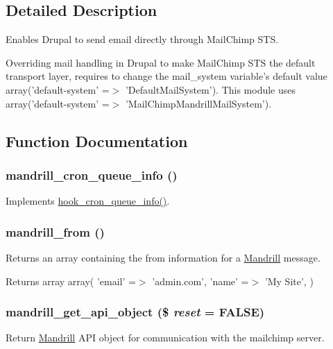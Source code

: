 \subsection{Detailed Description}
Enables Drupal to send email directly through MailChimp STS.

Overriding mail handling in Drupal to make MailChimp STS the default transport layer, requires to change the mail\_\-system variable's default value array('default-\/system' =$>$ 'DefaultMailSystem'). This module uses array('default-\/system' =$>$ 'MailChimpMandrillMailSystem'). 

\subsection{Function Documentation}
\hypertarget{mandrill_8module_aef3727ae488149f312f6951a77bbf7a9}{
\subsubsection[{mandrill\_\-cron\_\-queue\_\-info}]{\setlength{\rightskip}{0pt plus 5cm}mandrill\_\-cron\_\-queue\_\-info ()}}
\label{mandrill_8module_aef3727ae488149f312f6951a77bbf7a9}
Implements \hyperlink{group__hooks_gae161ed78fd5e8775ffc9264346a64320}{hook\_\-cron\_\-queue\_\-info()}. \hypertarget{mandrill_8module_afe985bcfaeb96000c36902ece6df9f71}{
\subsubsection[{mandrill\_\-from}]{\setlength{\rightskip}{0pt plus 5cm}mandrill\_\-from ()}}
\label{mandrill_8module_afe985bcfaeb96000c36902ece6df9f71}
Returns an array containing the from information for a \hyperlink{classMandrill}{Mandrill} message.

\begin{DoxyReturn}{Returns}
array array( 'email' =$>$ 'admin.com', 'name' =$>$ 'My Site', ) 
\end{DoxyReturn}
\hypertarget{mandrill_8module_a26f8a56e226e60202c0070adb37aec01}{
\subsubsection[{mandrill\_\-get\_\-api\_\-object}]{\setlength{\rightskip}{0pt plus 5cm}mandrill\_\-get\_\-api\_\-object (\$ {\em reset} = {\ttfamily FALSE})}}
\label{mandrill_8module_a26f8a56e226e60202c0070adb37aec01}
Return \hyperlink{classMandrill}{Mandrill} API object for communication with the mailchimp server.


